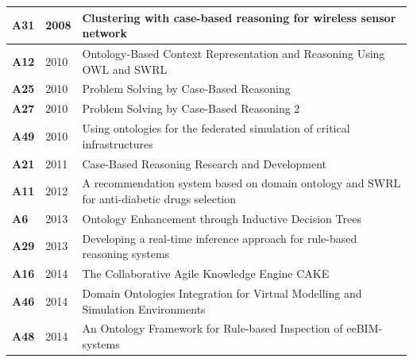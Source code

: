 {\begin{longtable}{ | m{1cm} | m{1.5cm} | m{12cm} | }
                    \hline
                    \textbf{A31} &2008 &Clustering with case-based reasoning for wireless sensor network \\ %
                    \hline
                    \textbf{A12} &2010 &Ontology-Based Context Representation and Reasoning Using OWL and SWRL \\ %
                    \hline
                    \textbf{A25} &2010 &Problem Solving by Case-Based Reasoning \\
                    \hline
                    \textbf{A27} &2010 &Problem Solving by Case-Based Reasoning 2 \\
                    \hline
                    \textbf{A49} &2010 &Using ontologies for the federated simulation of critical infrastructures \\ %
                    \hline
                    \textbf{A21} &2011 &Case-Based Reasoning Research and Development \\ %
                    \hline
                    \textbf{A11} &2012 &A recommendation system based on domain ontology and SWRL for anti-diabetic drugs selection \\ %
                    \hline
                    \textbf{A6} &2013 &Ontology Enhancement through Inductive Decision Trees \\ %
                    \hline
                    \textbf{A29} &2013 &Developing a real-time inference approach for rule-based reasoning systems \\ %
                    \hline
                    \textbf{A16} &2014 &The Collaborative Agile Knowledge Engine CAKE \\ %
                    \hline
                    \textbf{A46} &2014 &Domain Ontologies Integration for Virtual Modelling and Simulation Environments \\ %
                    \hline
                    \textbf{A48} &2014 &An Ontology Framework for Rule-based Inspection of eeBIM-systems \\ %

\end{longtable}}
